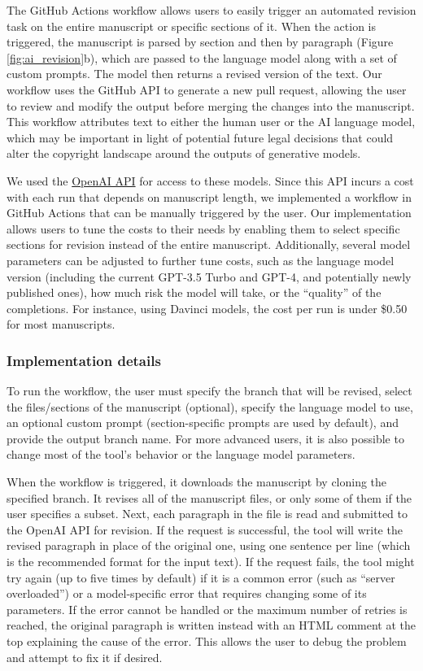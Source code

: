 \documentclass[
]{article}
\begin{document}
The GitHub Actions workflow allows users to easily trigger an automated revision task on the entire manuscript or specific sections of it.
When the action is triggered, the manuscript is parsed by section and then by paragraph (Figure \ref{fig:ai_revision}b), which are passed to the language model along with a set of custom prompts.
The model then returns a revised version of the text.
Our workflow uses the GitHub API to generate a new pull request, allowing the user to review and modify the output before merging the changes into the manuscript.
This workflow attributes text to either the human user or the AI language model, which may be important in light of potential future legal decisions that could alter the copyright landscape around the outputs of generative models.

We used the \href{https://openai.com/api/}{OpenAI API} for access to these models.
Since this API incurs a cost with each run that depends on manuscript length, we implemented a workflow in GitHub Actions that can be manually triggered by the user.
Our implementation allows users to tune the costs to their needs by enabling them to select specific sections for revision instead of the entire manuscript.
Additionally, several model parameters can be adjusted to further tune costs, such as the language model version (including the current GPT-3.5 Turbo and GPT-4, and potentially newly published ones), how much risk the model will take, or the ``quality'' of the completions.
For instance, using Davinci models, the cost per run is under \$0.50 for most manuscripts.

\subsubsection{Implementation details}

To run the workflow, the user must specify the branch that will be revised, select the files/sections of the manuscript (optional), specify the language model to use, an optional custom prompt (section-specific prompts are used by default), and provide the output branch name.
For more advanced users, it is also possible to change most of the tool's behavior or the language model parameters.

When the workflow is triggered, it downloads the manuscript by cloning the specified branch.
It revises all of the manuscript files, or only some of them if the user specifies a subset.
Next, each paragraph in the file is read and submitted to the OpenAI API for revision.
If the request is successful, the tool will write the revised paragraph in place of the original one, using one sentence per line (which is the recommended format for the input text).
If the request fails, the tool might try again (up to five times by default) if it is a common error (such as ``server overloaded'') or a model-specific error that requires changing some of its parameters.
If the error cannot be handled or the maximum number of retries is reached, the original paragraph is written instead with an HTML comment at the top explaining the cause of the error.
This allows the user to debug the problem and attempt to fix it if desired.
\end{document}
